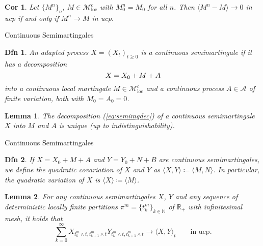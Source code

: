 \documentclass[a4paper]{article}
\theoremstyle{mytheoremstyle}
\newtheorem{definition}{Dfn}
\newtheorem{lemma}{Lemma}
\newtheorem{corollary}{Cor}[theorem]
\newcommand{\1}{\mathds{1}}
\begin{document}
\begin{multicols*}{3}
\begin{unlabeledbox}
\begin{corollary}
  \label{cor:ucp.criterion.locmart}Let $\{ M^n \}_n$, $M \in
  \mathcal{M}^c_{\operatorname{loc}}$ with $M^n_0 = M_0$ for all $n$. Then $\langle
  M^n - M \rangle \rightarrow 0$ in ucp if and only if $M^n \rightarrow M$ in
  ucp.
\end{corollary}
\end{unlabeledbox}

\begin{roundbox}{Continuous Semimartingales}
\begin{definition}
  An adapted process $X = (X_t)_{t \ge 0}$ is a {\emph{continuous
  semimartingale}} if it has a decomposition
  \vspace{-0.5em}
  \begin{equation}
    \label{eq:semimgdec} X = X_0 + M + A
  \vspace{-0.5em}
  \end{equation}
  into a continuous local martingale $M \in \mathcal{M}_{\operatorname{loc}}^c$ and a
  continuous process $A \in \mathcal{A}$ of finite variation, both with $M_0 =
  A_0 = 0$.
\end{definition}

\begin{lemma}
  \label{lem:decomposition.semimartingale}The decomposition
  (\ref{eq:semimgdec}) of a continuous semimartingale $X$ into $M$ and $A$ is
  unique (up to indistinguishability).
\end{lemma}
\end{roundbox}


\begin{roundbox}{Continuous Semimartingales}
\begin{definition}
  If $X = X_0 + M + A$ and $Y = Y_0 + N + B$ are continuous semimartingales,
  we define the quadratic covariation of $X$ and $Y$ as $\langle X, Y \rangle
  \coloneq \langle M, N \rangle$. In particular, the quadratic variation of $X$
  is $\langle X \rangle \coloneq \langle M \rangle$.
\end{definition}

\begin{lemma}
  \label{lem:qvlocSMG}For any continuous semimartingales $X$, $Y$ and any
  sequence of deterministic locally finite partitions $\pi^m = \{ t^m_k \}_{k
  \in \mathbb{N}}$ of $\mathbb{R}_+$ with infinitesimal mesh, it holds that
  \begin{equation}
    \sum_{k = 0}^{\infty} X_{t^m_k \wedge t, t^m_{k + 1} \wedge t} Y_{t^m_k
    \wedge t, t^m_{k + 1} \wedge t} \rightarrow \langle X, Y \rangle_t \qquad
    \text{in ucp} . \label{eq:qvlocSMG}
  \end{equation}
\end{lemma}
\end{roundbox}



\end{multicols*}
\end{document}
